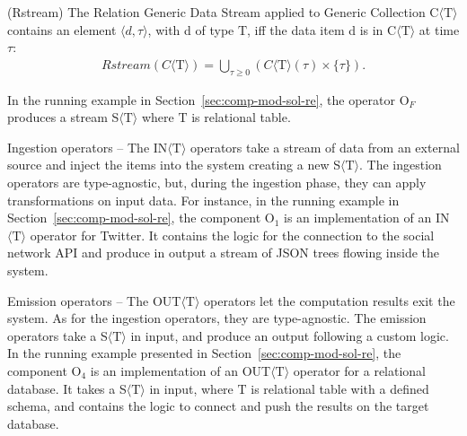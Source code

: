{\begin{Definition}
(Rstream) The Relation Generic Data Stream applied to Generic Collection C$\langle\mathrm{T}\rangle$ contains an element $\langle d,\tau \rangle$, with d of type $\mathrm{T}$, iff the data item d is in C$\langle\mathrm{T}\rangle$ at time $\tau$: 
\noindent\begin{align*}
Rstream(C\langle\mathrm{T}\rangle) = \bigcup_{\tau \geq 0} (C\langle\mathrm{T}\rangle(\tau) \times \{\tau\}).
\end{align*} 
\end{Definition}

In the running example in Section~\ref{sec:comp-mod-sol-re}, the operator O$_F$ produces a stream S$\langle\mathrm{T}\rangle$ where $\mathrm{T}$ is relational table.

\medskip

\textsf{Ingestion operators} -- The IN$\langle\mathrm{T}\rangle$ operators take a stream of data from an external source and inject the items into the system creating a new S$\langle\mathrm{T}\rangle$. The ingestion operators are type-agnostic, but, during the ingestion phase, they can apply transformations on input data.
For instance, in the running example in Section~\ref{sec:comp-mod-sol-re}, the component O$_1$ is an implementation of an IN$\langle\mathrm{T}\rangle$ operator for Twitter. It contains the logic for the connection to the social network API and produce in output a stream of JSON trees flowing inside the system.

\medskip

\textsf{Emission operators} -- The OUT$\langle\mathrm{T}\rangle$ operators let the computation results exit the system. As for the ingestion operators, they are type-agnostic. The emission operators take a S$\langle\mathrm{T}\rangle$ in input, and produce an output following a custom logic.
In the running example presented in Section~\ref{sec:comp-mod-sol-re}, the component O$_4$ is an implementation of an OUT$\langle\mathrm{T}\rangle$ operator for a relational database. It takes a S$\langle\mathrm{T}\rangle$ in input, where $\mathrm{T}$ is relational table with a defined schema, and contains the logic to connect and push the results on the target database. 

\medskip

}
